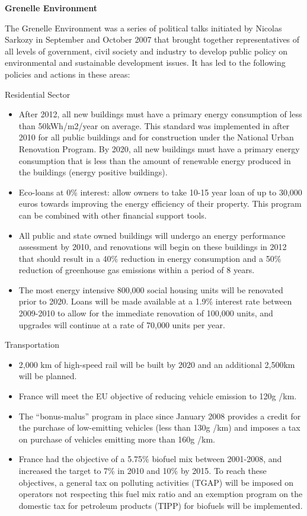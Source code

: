 \textbf{Grenelle Environment}



The Grenelle Environment was a series of political talks initiated by Nicolas Sarkozy in September and October 2007 that brought together representatives of all levels of government, civil society and industry to develop public policy on environmental and sustainable development issues. 
It has led to the following policies and actions in these areas:


Residential Sector
\begin{itemize}
	\item After 2012, all new buildings must have a primary energy consumption of less than 50kWh/m2/year on average. This standard was implemented in after 2010 for all public buildings and for construction under the National Urban Renovation Program. By 2020, all new buildings must have a primary energy consumption that is less than the amount of renewable energy produced in the buildings (energy positive buildings).
	\item Eco-loans at 0\% interest: allow owners to take 10-15 year loan of up to 30,000 euros towards improving the energy efficiency of their property. This program can be combined with other financial support tools.
	\item All public and state owned buildings will undergo an energy performance assessment by 2010,  and renovations will begin on these buildings in 2012 that should result in a 40\% reduction in energy consumption and a 50\% reduction of greenhouse gas emissions within a period of 8 years.
	\item The most energy intensive 800,000 social housing units will be renovated prior to 2020. Loans will be made available at a 1.9\% interest rate between 2009-2010 to allow for the immediate renovation of 100,000 units, and upgrades will continue at a rate of 70,000 units per year.
\end{itemize}



Transportation
\begin{itemize}
	\item 2,000 km of high-speed rail will be built by 2020 and an additional 2,500km will be planned. 
	\item France will meet the EU objective of reducing vehicle emission to 120g /km.
	\item The “bonus-malus” program in place since January 2008 provides a credit for the purchase of low-emitting vehicles  (less than 130g /km) and imposes a tax on purchase of vehicles emitting more than 160g /km.
	\item France had the objective of a 5.75\% biofuel mix between 2001-2008, and increased the target to 7\% in 2010 and 10\% by 2015. To reach these objectives, a general tax on polluting activities (TGAP) will be imposed on operators not respecting this fuel mix ratio and an exemption program on the domestic tax for petroleum products (TIPP) for biofuels will be implemented.
\end{itemize}




